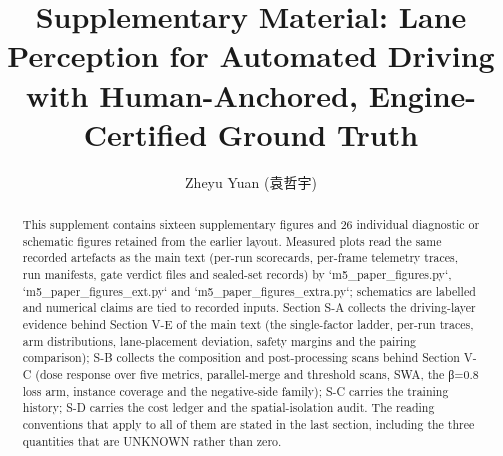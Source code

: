 \documentclass[journal]{IEEEtran}
\title{Supplementary Material: Lane Perception for Automated Driving with Human-Anchored, Engine-Certified Ground Truth}
\author{Zheyu Yuan (袁哲宇)}
\begin{document}
\maketitle
\begin{abstract}
This supplement contains sixteen supplementary figures and 26 individual diagnostic or schematic figures retained from the earlier layout. Measured plots read the same recorded artefacts as the main text (per-run scorecards, per-frame telemetry traces, run manifests, gate verdict files and sealed-set records) by `m5_paper_figures.py`, `m5_paper_figures_ext.py` and `m5_paper_figures_extra.py`; schematics are labelled and numerical claims are tied to recorded inputs. Section S-A collects the driving-layer evidence behind Section V-E of the main text (the single-factor ladder, per-run traces, arm distributions, lane-placement deviation, safety margins and the pairing comparison); S-B collects the composition and post-processing scans behind Section V-C (dose response over five metrics, parallel-merge and threshold scans, SWA, the β=0.8 loss arm, instance coverage and the negative-side family); S-C carries the training history; S-D carries the cost ledger and the spatial-isolation audit. The reading conventions that apply to all of them are stated in the last section, including the three quantities that are UNKNOWN rather than zero.
\end{abstract}
\end{document}
